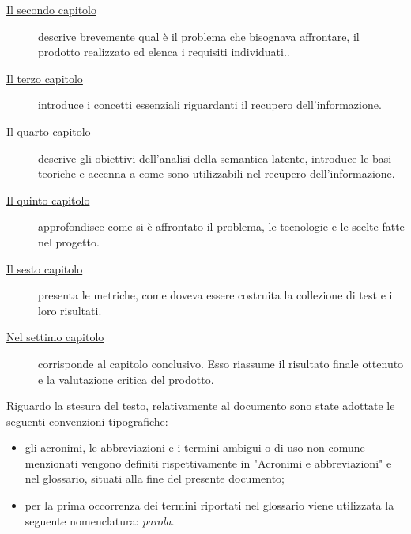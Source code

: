 \begin{description}
    \item[{\hyperref[cap:analisi-requisiti]{Il secondo capitolo}}] descrive brevemente qual è il problema che bisognava affrontare, il prodotto realizzato ed elenca i requisiti individuati..
    
    \item[{\hyperref[cap:recupero-informazione]{Il terzo capitolo}}] introduce i concetti essenziali riguardanti il recupero dell’informazione.
    
    \item[{\hyperref[cap:latent-semantic-indexing]{Il quarto capitolo}}] descrive gli obiettivi dell’analisi della semantica latente, introduce le basi teoriche e accenna a come sono utilizzabili nel recupero dell’informazione.
    
    \item[{\hyperref[cap:progettazione-sviluppo]{Il quinto capitolo}}] approfondisce come si è affrontato il problema, le tecnologie e le scelte fatte nel progetto.
    
    \item[{\hyperref[cap:testing]{Il sesto capitolo}}] presenta le metriche, come doveva essere costruita la collezione di test e i loro risultati. 
    
    \item[{\hyperref[cap:conclusioni]{Nel settimo capitolo}}] corrisponde al capitolo conclusivo. Esso riassume il risultato finale ottenuto e la valutazione critica del prodotto.
\end{description}

Riguardo la stesura del testo, relativamente al documento sono state adottate le seguenti convenzioni tipografiche:
\begin{itemize}
	\item gli acronimi, le abbreviazioni e i termini ambigui o di uso non comune menzionati
    vengono definiti rispettivamente in "Acronimi e abbreviazioni" e nel glossario,
    situati alla fine del presente documento;
	\item per la prima occorrenza dei termini riportati nel glossario viene utilizzata la seguente nomenclatura: \emph{parola}\glsfirstoccur{}.
\end{itemize}
